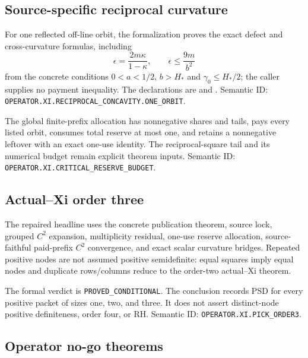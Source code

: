 \subsection{Source-specific reciprocal curvature}

For one reflected off-line orbit, the formalization proves the exact defect and
cross-curvature formulas, including
\[
 \epsilon=\frac{2m\kappa}{1-\kappa},
 \qquad \epsilon\le \frac{9m}{b^2}
\]
from the concrete conditions $0<a<1/2$, $b>H_*$ and
$\gamma_0\le H_*/2$; the caller supplies no payment inequality.  The declarations are
 and
.
Semantic ID: \texttt{OPERATOR.XI.RECIPROCAL\_CONCAVITY.ONE\_ORBIT}.

The global finite-prefix allocation has nonnegative shares and tails, pays every
listed orbit, consumes total reserve at most one, and retains a nonnegative
leftover with an exact one-use identity.  The reciprocal-square tail and its
numerical budget remain explicit theorem inputs.
\notready
{}
Semantic ID: \texttt{OPERATOR.XI.CRITICAL\_RESERVE\_BUDGET}.

\subsection{Actual--Xi order three}

The repaired headline
uses the concrete publication theorem, source lock, grouped $C^2$ expansion,
multiplicity residual, one-use reserve allocation, source-faithful paid-prefix
$C^2$ convergence, and exact scalar curvature bridges.  Repeated positive nodes are not assumed positive semidefinite: equal
squares imply equal nodes and duplicate rows/columns reduce to the order-two
actual--Xi theorem.

\notready
The formal verdict is \texttt{PROVED\_CONDITIONAL}.  The conclusion records PSD for every positive packet of sizes one, two, and
three.  It does not assert distinct-node positive
definiteness, order four, or RH.
Semantic ID: \texttt{OPERATOR.XI.PICK\_ORDER3}.

\subsection{Operator no-go theorems}

